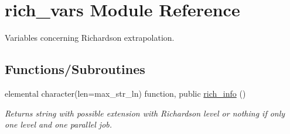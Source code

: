 \hypertarget{namespacerich__vars}{}\section{rich\+\_\+vars Module Reference}
\label{namespacerich__vars}


Variables concerning Richardson extrapolation.  


\subsection*{Functions/\+Subroutines}
\begin{DoxyCompactItemize}
\item 
elemental character(len=max\+\_\+str\+\_\+ln) function, public \hyperlink{namespacerich__vars_a4f54d3fc0ac510fc073220794ee4fa37}{rich\+\_\+info} ()
\begin{DoxyCompactList}\small\item\em Returns string with possible extension with Richardson level or nothing if only one level and one parallel job. \end{DoxyCompactList}\end{DoxyCompactItemize}
